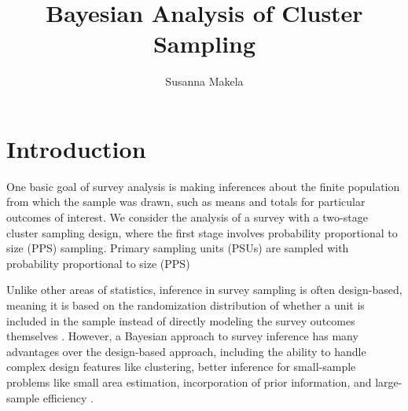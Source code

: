 \documentclass[12pt,a4paper]{article}
\author{Susanna Makela}
\title{Bayesian Analysis of Cluster Sampling}
\begin{document}
\maketitle
\onehalfspacing

\section*{Introduction}
One basic goal of survey analysis is making inferences about the finite population from which the sample was drawn, such as means and totals for particular outcomes of interest. We consider the analysis of a survey with a two-stage cluster sampling design, where the first stage involves probability proportional to size (PPS) sampling. Primary sampling units (PSUs) are sampled with probability proportional to size (PPS)

Unlike other areas of statistics, inference in survey sampling is often design-based, meaning it is based on the randomization distribution of whether a unit is included in the sample instead of directly modeling the survey outcomes themselves \citep{little2004}. However, a Bayesian approach to survey inference has many advantages over the design-based approach, including the ability to handle complex design features like clustering, better inference for small-sample problems like small area estimation, incorporation of prior information, and large-sample efficiency \citep{little2004}.
\end{document}

